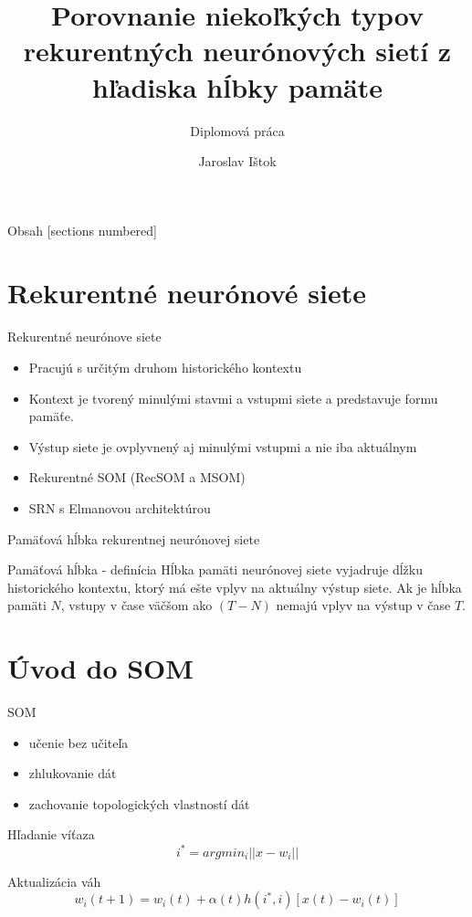\documentclass[10pt]{beamer}
\title{Porovnanie niekoľkých typov rekurentných neurónových sietí z hľadiska hĺbky pamäte}
\subtitle{Diplomová práca}
\date{}
\author{Jaroslav Ištok}
\institute{Školiteľ: doc. RNDr. Martin Takáč, PhD.}
\begin{document}
\maketitle

\begin{frame}{Obsah}
  [sections numbered]
  \tableofcontents
\end{frame}


\section{Rekurentné neurónové siete}

\begin{frame}[fragile]{Rekurentné neurónove siete}
  \begin{itemize}
    \item Pracujú s určitým druhom historického kontextu
    \item Kontext je tvorený minulými stavmi a vstupmi siete a predstavuje formu pamäťe.
    \item Výstup siete je ovplyvnený aj minulými vstupmi a nie iba aktuálnym
    \item Rekurentné SOM (RecSOM a MSOM)
    \item SRN s Elmanovou architektúrou 
  \end{itemize}
\end{frame}

\begin{frame}[fragile]{Pamäťová hĺbka rekurentnej neurónovej siete}
  \begin{block}{Pamäťová hĺbka - definícia}
    Hĺbka pamäti neurónovej siete vyjadruje dĺžku historického kontextu, ktorý má 
    ešte vplyv na aktuálny výstup siete. Ak je hĺbka pamäti $N$, vstupy v čase väčšom ako 
    $(T - N)$ nemajú vplyv na výstup v čase $T$.
  \end{block}
\end{frame}


\section{Úvod do SOM}
\begin{frame}[fragile]{SOM}
  \begin{itemize}
    \item učenie bez učiteľa
    \item zhlukovanie dát
    \item zachovanie topologických vlastností dát
  \end{itemize}

  Hľadanie víťaza
  \begin{equation*}
    i^* = argmin_i||x-w_i|| 
  \end{equation*}

  Aktualizácia váh
  \begin{equation*}
    w_i(t + 1) = w_i(t) + \alpha(t)h(i^*, i)[x(t) - w_i(t)]
  \end{equation*}
\end{frame}
\end{document}
